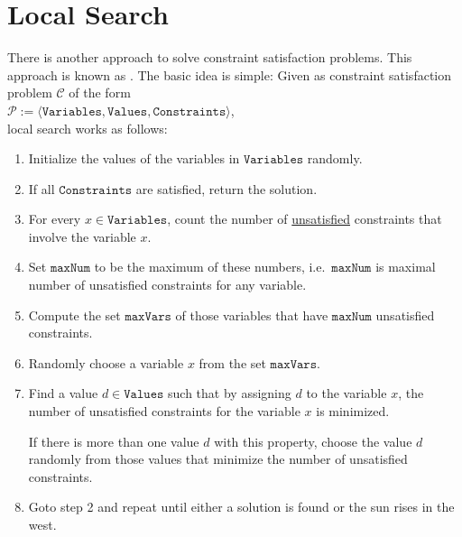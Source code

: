 \section{Local Search}
There is another approach to solve constraint satisfaction problems.  This approach is known as
.  The basic idea is simple: Given as constraint satisfaction problem 
$\mathcal{C}$ of the form 
\\[0.2cm]
\hspace*{1.3cm}
$\mathcal{P} := \langle \texttt{Variables}, \texttt{Values}, \texttt{Constraints} \rangle$,
\\[0.2cm] 
local search works as follows:
\begin{enumerate}
\item Initialize the values of the variables in $\texttt{Variables}$ randomly.  
\item If all $\texttt{Constraints}$ are satisfied, return the solution.
\item For every  $x \in \texttt{Variables}$, count the number of \underline{unsatisfied} constraints that involve the
      variable $x$. 
\item Set $\texttt{maxNum}$ to be the maximum of these numbers, i.e.~$\texttt{maxNum}$ is maximal number of
      unsatisfied constraints for any variable.
\item Compute the set $\texttt{maxVars}$ of those variables that have $\texttt{maxNum}$ unsatisfied constraints.
\item Randomly choose a variable $x$ from the set $\texttt{maxVars}$.
\item Find a value $d \in \texttt{Values}$ such that by assigning $d$ to the variable $x$, the number of
      unsatisfied constraints for the variable $x$ is minimized.  

      If there is more than one value $d$ with this property, choose the value $d$ randomly from those values
      that minimize the number of unsatisfied constraints.
\item Goto step 2 and repeat until either a solution is found or the sun rises in the west.
\end{enumerate}

